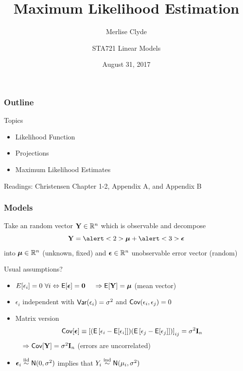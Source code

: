 \documentclass[handout]{beamer}
\title{Maximum Likelihood Estimation}
\subtitle{Merlise Clyde}
\author{STA721 Linear Models}
\institute{Duke University}
\date{August 31, 2017}
\begin{document}
\maketitle
\begin{frame}\frametitle{Outline}
Topics
  \begin{itemize}
 \item Likelihood Function
  \item Projections
  \item Maximum Likelihood Estimates


  \end{itemize}


Readings: Christensen Chapter 1-2, Appendix A, and Appendix B
\end{frame}


\begin{frame}
  \frametitle{Models}
Take an random vector $\mathbf{Y} \in \mathbb{R}^n$ which is observable and decompose  \pause
$$ \Y = \alert<2>{\mub} + \alert<3>{\eps}$$
into  \alert<2>{$\boldsymbol{\mu} \in \mathbb{R}^n$ (unknown, fixed)} \pause and
\alert<3>{$\boldsymbol{\epsilon} \in \mathbb{R}^n$ unobservable error vector (random)}
\pause

\vspace{18pt}
Usual assumptions? \pause
\begin{itemize}
\item $E[\epsilon_i] = 0 \ \forall i \Leftrightarrow \textsf{E}[\boldsymbol{\epsilon}] = \mathbf{0}$ \pause  $ \quad \Rightarrow \textsf{E}[\mathbf{Y}] = \boldsymbol{\mu}$
  (mean vector) \pause
\item $\epsilon_i$ independent with $\textsf{Var}(\epsilon_i) = \sigma^2$ and
  $\textsf{Cov}(\epsilon_i, \epsilon_j) = 0$
\item Matrix version $$\textsf{Cov}[\boldsymbol{\epsilon}] \equiv \left[ (\textsf{E}\left[\epsilon_i -
  \textsf{E}[\epsilon_i]\right])(\textsf{E}\left[\epsilon_j - \textsf{E}[\epsilon_j]\right])\right]_{ij} = \sigma^2 \mathbf{I}_n$$   \pause  $ \quad \Rightarrow
  \textsf{Cov}[\mathbf{Y}] = \sigma^2 \mathbf{I}_n$  (errors are uncorrelated) \pause
\item $\boldsymbol{\epsilon}_i \mathrel{\mathop{\sim}\limits^{\rm iid}} \textsf{N}(0, \sigma^2)$  implies that $Y_i \mathrel{\mathop{\sim}\limits^{\rm ind}} \textsf{N}(\mu_i, \sigma^2)$
\end{itemize}

\end{frame}
\end{document}
